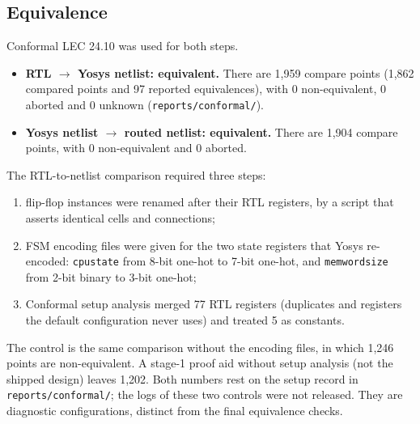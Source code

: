 \documentclass[11pt,letterpaper]{article}
\newcommand{\sk}[1]{\texttt{#1}}
\renewcommand{\_}{\textunderscore\penalty0\hskip0pt\relax}
\begin{document}
\subsection*{Equivalence}
Conformal LEC 24.10 was used for both steps.
\begin{itemize}
\item \textbf{RTL $\to$ Yosys netlist: equivalent.} There are 1,959 compare points (1,862 compared points and 97 reported equivalences), with 0 non-equivalent, 0 aborted and 0 unknown (\sk{reports/conformal/}).
\item \textbf{Yosys netlist $\to$ routed netlist: equivalent.} There are 1,904 compare points, with 0 non-equivalent and 0 aborted.
\end{itemize}
The RTL-to-netlist comparison required three steps:
\begin{enumerate}
\item flip-flop instances were renamed after their RTL registers, by a script that asserts identical cells and connections;
\item FSM encoding files were given for the two state registers that Yosys re-encoded: \sk{cpu\_state} from 8-bit one-hot to 7-bit one-hot, and \sk{mem\_wordsize} from 2-bit binary to 3-bit one-hot;
\item Conformal setup analysis merged 77 RTL registers (duplicates and registers the default configuration never uses) and treated 5 as constants.
\end{enumerate}
The control is the same comparison without the encoding files, in which 1,246 points are non-equivalent. A stage-1 proof aid without setup analysis (not the shipped design) leaves 1,202. Both numbers rest on the setup record in \sk{reports/conformal/}; the logs of these two controls were not released. They are diagnostic configurations, distinct from the final equivalence checks.
\end{document}
